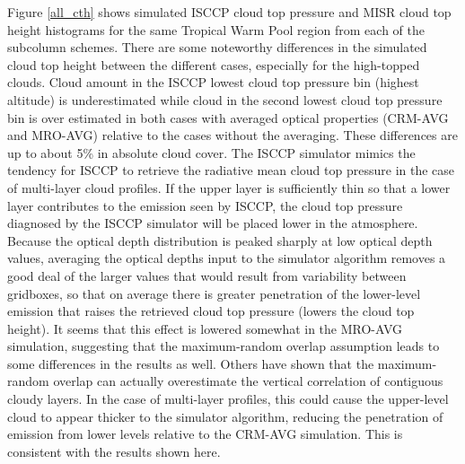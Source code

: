 \documentclass[letter]{article}
\begin{document}
Figure \ref{all_cth} shows simulated ISCCP cloud top pressure and MISR cloud top height histograms for the same Tropical Warm Pool region from each of the subcolumn schemes. There are some noteworthy differences in the simulated cloud top height between the different cases, especially for the high-topped clouds. Cloud amount in the ISCCP lowest cloud top pressure bin (highest altitude) is underestimated while cloud in the second lowest cloud top pressure bin is over estimated in both cases with averaged optical properties (CRM-AVG and MRO-AVG) relative to the cases without the averaging. These differences are up to about 5\% in absolute cloud cover. The ISCCP simulator mimics the tendency for ISCCP to retrieve the radiative mean cloud top pressure in the case of multi-layer cloud profiles. If the upper layer is sufficiently thin so that a lower layer contributes to the emission seen by ISCCP, the cloud top pressure diagnosed by the ISCCP simulator will be placed lower in the atmosphere. Because the optical depth distribution is peaked sharply at low optical depth values, averaging the optical depths input to the simulator algorithm removes a good deal of the larger values that would result from variability between gridboxes, so that on average there is greater penetration of the lower-level emission that raises the retrieved cloud top pressure (lowers the cloud top height). It seems that this effect is lowered somewhat in the MRO-AVG simulation, suggesting that the maximum-random overlap assumption leads to some differences in the results as well. Others have shown \citep[e.g.,][]{mace_and_benson-troth_2002} that the maximum-random overlap can actually overestimate the vertical correlation of contiguous cloudy layers. In the case of multi-layer profiles, this could cause the upper-level cloud to appear thicker to the simulator algorithm, reducing the penetration of emission from lower levels relative to the CRM-AVG simulation. This is consistent with the results shown here.
\end{document}
